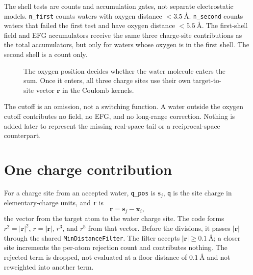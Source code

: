 \documentclass[11pt]{article}
\newcommand{\code}[1]{\texttt{#1}}
\begin{document}
The shell tests are counts and accumulation gates, not separate electrostatic
models. \code{n\_first} counts waters with oxygen distance
\(<\SI{3.5}{\angstrom}\). \code{n\_second} counts waters that failed the first
test and have oxygen distance \(<\SI{5.5}{\angstrom}\). The first-shell field
and EFG accumulators receive the same three charge-site contributions as the
total accumulators, but only for waters whose oxygen is in the first shell.
The second shell is a count only.

\begin{figure}[ht]
\centering
{}
\caption{The oxygen position decides whether the water molecule enters the
sum. Once it enters, all three charge sites use their own target-to-site vector
\(\bm r\) in the Coulomb kernels.}
\end{figure}

The cutoff is an omission, not a switching function. A water outside the oxygen
cutoff contributes no field, no EFG, and no long-range correction. Nothing is
added later to represent the missing real-space tail or a reciprocal-space
counterpart.

\section{One charge contribution}

For a charge site from an accepted water, \code{q\_pos} is \(\bm s_j\),
\code{q} is the site charge in elementary-charge units, and \code{r} is
\[
  \bm r = \bm s_j-\bm x_i ,
\]
the vector from the target atom to the water charge site. The code forms
\(r^2=|\bm r|^2\), \(r=|\bm r|\), \(r^3\), and \(r^5\) from that vector. Before
the divisions, it passes \(|\bm r|\) through the shared
\code{MinDistanceFilter}. The filter accepts
\(|\bm r|\ge\SI{0.1}{\angstrom}\); a closer site increments the per-atom
rejection count and contributes nothing. The rejected term is dropped, not
evaluated at a floor distance of \(\SI{0.1}{\angstrom}\) and not reweighted into
another term.
\end{document}

